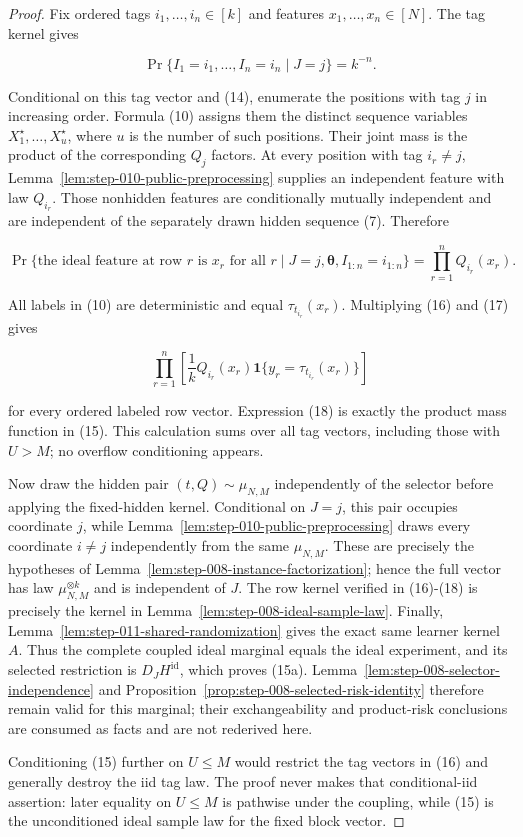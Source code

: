 \begin{proof}
Fix ordered tags \(i_1,\ldots,i_n\in[k]\) and features
\(x_1,\ldots,x_n\in[N]\). The tag kernel gives

\[
  \Pr\{I_1=i_1,\ldots,I_n=i_n\mid J=j\}=k^{-n}.
\tag{16}
\]

Conditional on this tag vector and (14), enumerate the positions with
tag \(j\) in increasing order. Formula (10) assigns them the distinct
sequence variables \(X_1^\star,\ldots,X_u^\star\), where \(u\) is the
number of such positions. Their joint mass is the product of the
corresponding \(Q_j\) factors. At every position with tag \(i_r\ne j\),
Lemma~\ref{lem:step-010-public-preprocessing} supplies an
independent feature with law \(Q_{i_r}\). Those nonhidden features are
conditionally mutually independent and are independent of the separately
drawn hidden sequence (7). Therefore

\[
  \Pr\{\text{the ideal feature at row }r\text{ is }x_r
        \text{ for all }r
       \mid J=j,\boldsymbol\theta,I_{1:n}=i_{1:n}\}
  =\prod_{r=1}^n Q_{i_r}(x_r).
\tag{17}
\]

All labels in (10) are deterministic and equal
\(\tau_{t_{i_r}}(x_r)\). Multiplying (16) and (17) gives

\[
  \prod_{r=1}^n\left[
    \frac1k Q_{i_r}(x_r)
    \mathbf1\{y_r=\tau_{t_{i_r}}(x_r)\}
  \right]
\tag{18}
\]

for every ordered labeled row vector. Expression (18) is exactly the
product mass function in (15). This calculation sums over all tag vectors,
including those with \(U>M\); no overflow conditioning appears.

Now draw the hidden pair \((t,Q)\sim\mu_{N,M}\) independently of the
selector before applying the fixed-hidden kernel. Conditional on \(J=j\),
this pair occupies coordinate \(j\), while
Lemma~\ref{lem:step-010-public-preprocessing} draws every coordinate
\(i\ne j\) independently from the
same \(\mu_{N,M}\). These are precisely the hypotheses of Lemma~\ref{lem:step-008-instance-factorization}; hence the full vector has
law \(\mu_{N,M}^{\otimes k}\) and is independent of \(J\). The row kernel
verified in (16)-(18) is precisely the kernel in Lemma~\ref{lem:step-008-ideal-sample-law}. Finally,
Lemma~\ref{lem:step-011-shared-randomization} gives the exact same learner
kernel \(A\). Thus the complete coupled ideal marginal equals the ideal experiment, and its selected restriction is \(D_JH^{\mathrm{id}}\),
which proves (15a). Lemma~\ref{lem:step-008-selector-independence} and
Proposition~\ref{prop:step-008-selected-risk-identity} therefore remain
valid for this marginal; their exchangeability and product-risk
conclusions are consumed as facts and are not rederived here.

Conditioning (15) further on \(U\le M\) would restrict the tag vectors in
(16) and generally destroy the iid tag law. The proof never makes that
conditional-iid assertion: later equality on \(U\le M\) is pathwise under
the coupling, while (15) is the unconditioned ideal sample law for the fixed
block vector. \end{proof}

